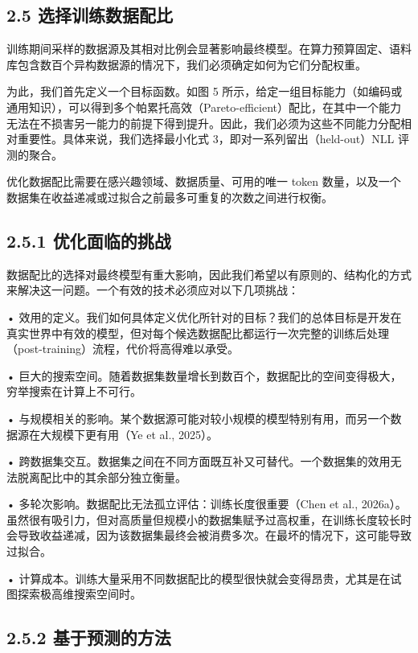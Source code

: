 \subsection{2.5 选择训练数据配比}\label{selecting-a-data-mixture-for-training}

训练期间采样的数据源及其相对比例会显著影响最终模型。在算力预算固定、语料库包含数百个异构数据源的情况下，我们必须确定如何为它们分配权重。

为此，我们首先定义一个目标函数。如图 5 所示，给定一组目标能力（如编码或通用知识），可以得到多个帕累托高效（Pareto-efficient）配比，在其中一个能力无法在不损害另一能力的前提下得到提升。因此，我们必须为这些不同能力分配相对重要性。具体来说，我们选择最小化式 3，即对一系列留出（held-out）NLL 评测的聚合。

优化数据配比需要在感兴趣领域、数据质量、可用的唯一 token 数量，以及一个数据集在收益递减或过拟合之前最多可重复的次数之间进行权衡。

\subsection{2.5.1 优化面临的挑战}\label{challenges-to-optimization}

数据配比的选择对最终模型有重大影响，因此我们希望以有原则的、结构化的方式来解决这一问题。一个有效的技术必须应对以下几项挑战：

• 效用的定义。我们如何具体定义优化所针对的目标？我们的总体目标是开发在真实世界中有效的模型，但对每个候选数据配比都运行一次完整的训练后处理（post-training）流程，代价将高得难以承受。

• 巨大的搜索空间。随着数据集数量增长到数百个，数据配比的空间变得极大，穷举搜索在计算上不可行。

• 与规模相关的影响。某个数据源可能对较小规模的模型特别有用，而另一个数据源在大规模下更有用（Ye et al., 2025）。

• 跨数据集交互。数据集之间在不同方面既互补又可替代。一个数据集的效用无法脱离配比中的其余部分独立衡量。

• 多轮次影响。数据配比无法孤立评估：训练长度很重要（Chen et al., 2026a）。虽然很有吸引力，但对高质量但规模小的数据集赋予过高权重，在训练长度较长时会导致收益递减，因为该数据集最终会被消费多次。在最坏的情况下，这可能导致过拟合。

• 计算成本。训练大量采用不同数据配比的模型很快就会变得昂贵，尤其是在试图探索极高维搜索空间时。

\subsection{2.5.2 基于预测的方法}\label{forecastingbased-approaches}

